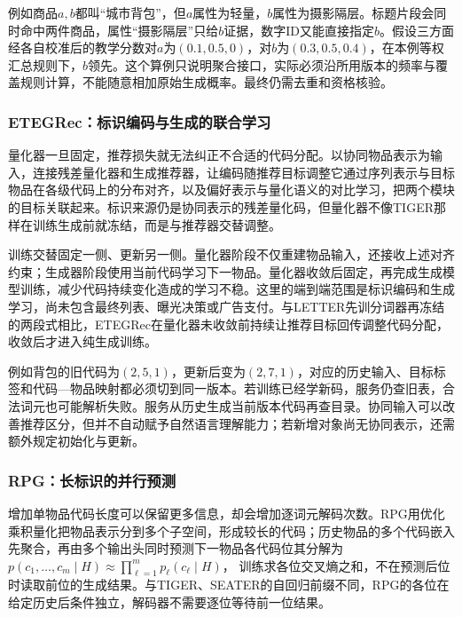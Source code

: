 例如商品$a,b$都叫“城市背包”，但$a$属性为轻量，$b$属性为摄影隔层。标题片段会同时命中两件商品，属性“摄影隔层”只给$b$证据，数字ID又能直接指定$b$。假设三方面经各自校准后的教学分数对$a$为$(0.1,0.5,0)$，对$b$为$(0.3,0.5,0.4)$，在本例等权汇总规则下，$b$领先。这个算例只说明聚合接口，实际必须沿所用版本的频率与覆盖规则计算，不能随意相加原始生成概率。最终仍需去重和资格核验。

\subsubsection{ETEGRec：标识编码与生成的联合学习}
\label{sec:rs-etegrec}

量化器一旦固定，推荐损失就无法纠正不合适的代码分配。以协同物品表示为输入，连接残差量化器和生成推荐器，让编码随推荐目标调整它通过序列表示与目标物品在各级代码上的分布对齐，以及偏好表示与量化语义的对比学习，把两个模块的目标关联起来。标识来源仍是协同表示的残差量化码，但量化器不像TIGER那样在训练生成前就冻结，而是与推荐器交替调整。

训练交替固定一侧、更新另一侧。量化器阶段不仅重建物品输入，还接收上述对齐约束；生成器阶段使用当前代码学习下一物品。量化器收敛后固定，再完成生成模型训练，减少代码持续变化造成的学习不稳。这里的端到端范围是标识编码和生成学习，尚未包含最终列表、曝光决策或广告支付。与LETTER先训分词器再冻结的两段式相比，ETEGRec在量化器未收敛前持续让推荐目标回传调整代码分配，收敛后才进入纯生成训练。

例如背包的旧代码为$(2,5,1)$，更新后变为$(2,7,1)$，对应的历史输入、目标标签和代码—物品映射都必须切到同一版本。若训练已经学新码，服务仍查旧表，合法词元也可能解析失败。服务从历史生成当前版本代码再查目录。协同输入可以改善推荐区分，但并不自动赋予自然语言理解能力；若新增对象尚无协同表示，还需额外规定初始化与更新。

\subsubsection{RPG：长标识的并行预测}
\label{sec:rs-rpg}

增加单物品代码长度可以保留更多信息，却会增加逐词元解码次数。RPG用优化乘积量化把物品表示分到多个子空间，形成较长的代码；历史物品的多个代码嵌入先聚合，再由多个输出头同时预测下一物品各代码位其分解为
$p(c_1,\ldots,c_m\mid H)\approx\prod_{\ell=1}^m p_\ell(c_\ell\mid H)$，
训练求各位交叉熵之和，不在预测后位时读取前位的生成结果。与TIGER、SEATER的自回归前缀不同，RPG的各位在给定历史后条件独立，解码器不需要逐位等待前一位结果。

